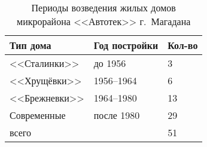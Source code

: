 
\begin{wraptable}{l}{7.0cm}
  \caption{Периоды возведения жилых домов микрорайона <<Автотек>> г.~Магадана }
  \label{tab:sydchak-tab}
  \begin{tabular}{lll}
\toprule
  Тип дома    & Год постройки & Кол-во \\
\midrule
  <<Сталинки>>    & до 1956       & 3      \\
  <<Хрущёвки>>    & 1956--1964     & 6      \\
  <<Брежневки>>   & 1964--1980     & 13     \\
  Современные & после 1980    & 29     \\\midrule
  всего       &               & 51\\ \bottomrule
  \end{tabular}


\end{wraptable}

